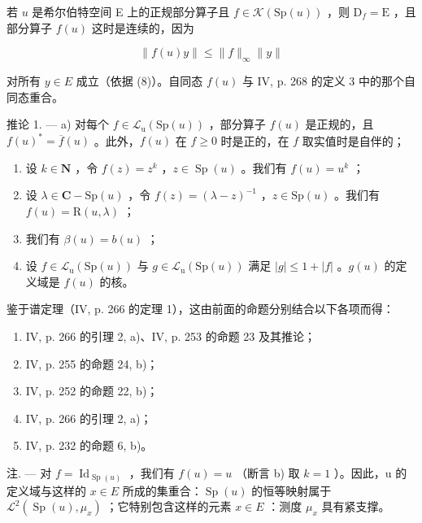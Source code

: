 若 \(u\) 是希尔伯特空间 E 上的正规部分算子且 \(f \in \mathcal{K}(\mathrm{Sp}(u))\) ，则 \(\mathrm{D}_f = \mathrm{E}\) ，且部分算子 \(f(u)\) 这时是连续的，因为

\[
\| f (u) y \| \leqslant \| f \| _ {\infty} \| y \|
\]

对所有 \(y \in E\) 成立（依据 (8)）。自同态 \(f(u)\) 与 IV, p. 268 的定义 3 中的那个自同态重合。

推论 1. --- a) 对每个 \(f \in \mathcal{L}_{\mathrm{u}}(\mathrm{Sp}(u))\) ，部分算子 \(f(u)\) 是正规的，且 \(f(u)^{*} = \overline{f}(u)\) 。此外，\(f(u)\) 在 \(f \geqslant 0\) 时是正的，在 \(f\) 取实值时是自伴的；

\begin{enumerate}
\def\labelenumi{\alph{enumi})}
\setcounter{enumi}{1}
\item
  设 \(k \in \mathbf{N}\) ，令 \(f(z) = z^{k}\) ，\(z \in \operatorname{Sp}(u)\) 。我们有 \(f(u) = u^{k}\) ；
\item
  设 \(\lambda \in \mathbf{C} - \mathrm{Sp}(u)\) ，令 \(f(z) = (\lambda - z)^{-1}\) ，\(z \in \mathrm{Sp}(u)\) 。我们有 \(f(u) = \mathrm{R}(u, \lambda)\) ；
\item
  我们有 \(\beta(u) = b(u)\) ；
\item
  设 \(f \in \mathcal{L}_{\mathrm{u}}(\mathrm{Sp}(u))\) 与 \(g \in \mathcal{L}_{\mathrm{u}}(\mathrm{Sp}(u))\) 满足 \(|g| \leqslant 1 + |f|\) 。\(g(u)\) 的定义域是 \(f(u)\) 的核。
\end{enumerate}

鉴于谱定理（IV, p. 266 的定理 1），这由前面的命题分别结合以下各项而得：

\begin{enumerate}
\def\labelenumi{\alph{enumi})}
\item
  IV, p. 266 的引理 2, a)、IV, p. 253 的命题 23 及其推论；
\item
  IV, p. 255 的命题 24, b)；
\item
  IV, p. 252 的命题 22, b)；
\item
  IV, p. 266 的引理 2, a)；
\item
  IV, p. 232 的命题 6, b)。
\end{enumerate}

注. --- 对 \(f = \operatorname{Id}_{\operatorname{Sp}(u)}\) ，我们有 \(f(u) = u\) （断言 b) 取 \(k = 1\) ）。因此，u 的定义域与这样的 \(x \in E\) 所成的集重合：\(\operatorname{Sp}(u)\) 的恒等映射属于 \(\mathcal{L}^{2}(\operatorname{Sp}(u), \mu_{x})\) ；它特别包含这样的元素 \(x \in E\) ：测度 \(\mu_{x}\) 具有紧支撑。

